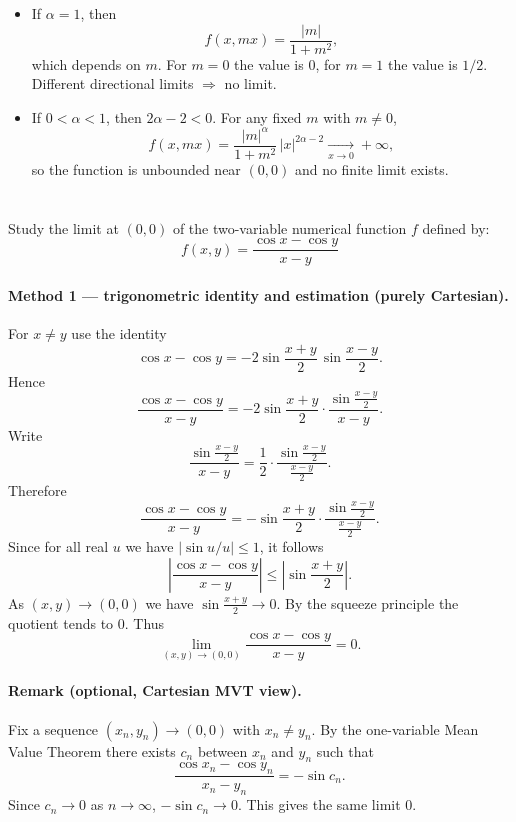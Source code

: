 \documentclass[12pt]{article}
\begin{document}
\begin{correctionbox}
\begin{enumerate}
\begin{itemize}
\item If \(\alpha=1\), then
\[
f(x,mx)=\frac{|m|}{1+m^2},
\]
which depends on \(m\). For \(m=0\) the value is \(0\), for \(m=1\) the value is \(1/2\). Different directional limits \(\Rightarrow\) no limit.

\item If \(0<\alpha<1\), then \(2\alpha-2<0\). For any fixed \(m\) with \(m\neq0\),
\[
f(x,mx)=\frac{|m|^\alpha}{1+m^2}\,|x|^{2\alpha-2}\xrightarrow[x\to0]{}+\infty,
\]
so the function is unbounded near \((0,0)\) and no finite limit exists.
\end{itemize}

\end{enumerate}
\end{correctionbox}

\section{}
Study the limit at $(0, 0)$ of the two-variable numerical function $f$ defined by:
$$f(x, y) = \frac{\cos x - \cos y}{x - y}$$

\begin{correctionbox}
\paragraph{Method 1 — trigonometric identity and estimation (purely Cartesian).}
For \(x\neq y\) use the identity
\[
\cos x-\cos y = -2\sin\!\frac{x+y}{2}\,\sin\!\frac{x-y}{2}.
\]
Hence
\[
\frac{\cos x-\cos y}{x-y}
= -2\sin\!\frac{x+y}{2}\cdot\frac{\sin\!\frac{x-y}{2}}{x-y}.
\]
Write
\[
\frac{\sin\!\frac{x-y}{2}}{x-y}=\frac12\cdot\frac{\sin\!\frac{x-y}{2}}{\frac{x-y}{2}}.
\]
Therefore
\[
\frac{\cos x-\cos y}{x-y}
= -\sin\!\frac{x+y}{2}\cdot\frac{\sin\!\frac{x-y}{2}}{\frac{x-y}{2}}.
\]
Since for all real \(u\) we have \(\bigl|\sin u / u\bigr|\le 1\), it follows
\[
\left|\frac{\cos x-\cos y}{x-y}\right|
\le \left|\sin\!\frac{x+y}{2}\right|.
\]
As \((x,y)\to(0,0)\) we have \(\sin\!\frac{x+y}{2}\to 0\). By the squeeze principle the quotient tends to \(0\). Thus
\[
\boxed{\lim_{(x,y)\to(0,0)}\frac{\cos x-\cos y}{x-y}=0.}
\]

\paragraph{Remark (optional, Cartesian MVT view).}
Fix a sequence \((x_n,y_n)\to(0,0)\) with \(x_n\neq y_n\). By the one-variable Mean Value Theorem there exists \(c_n\) between \(x_n\) and \(y_n\) such that
\[
\frac{\cos x_n-\cos y_n}{x_n-y_n} = -\sin c_n.
\]
Since \(c_n\to0\) as \(n\to\infty\), \(-\sin c_n\to0\). This gives the same limit \(0\).
\end{correctionbox}
\end{document}
